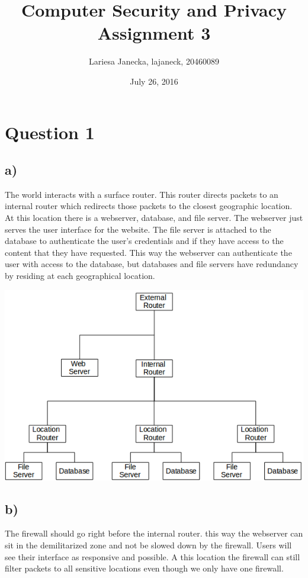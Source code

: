 \documentclass{article}
\begin{document}
\title{Computer Security and Privacy Assignment 3}
\date{July 26, 2016}
\author{Lariesa Janecka, lajaneck, 20460089}
\maketitle


\section*{Question 1}
\label{sec:question_1}
\subsection*{a)}
\label{sub:a_}
The world interacts with a surface router. This router directs packets  to an internal router which redirects those packets to the closest geographic location. At this location there is a webserver, database, and file server. The webserver just serves the user interface for the website. The file server is attached to the database to authenticate the user's credentials and if they have access to the content that they have requested. This way the webserver can authenticate the user with access to the database, but databases and file servers have redundancy by residing at each geographical location.

\includegraphics[scale=0.8]{network}

\subsection*{b)}
\label{sub:b_}
The firewall should go right before the internal router. this way the webserver can sit in the demilitarized zone and not be slowed down by the firewall. Users will see their interface as responsive and possible. A this location the firewall can still filter packets to all sensitive locations even though we only have one firewall.
\end{document}
